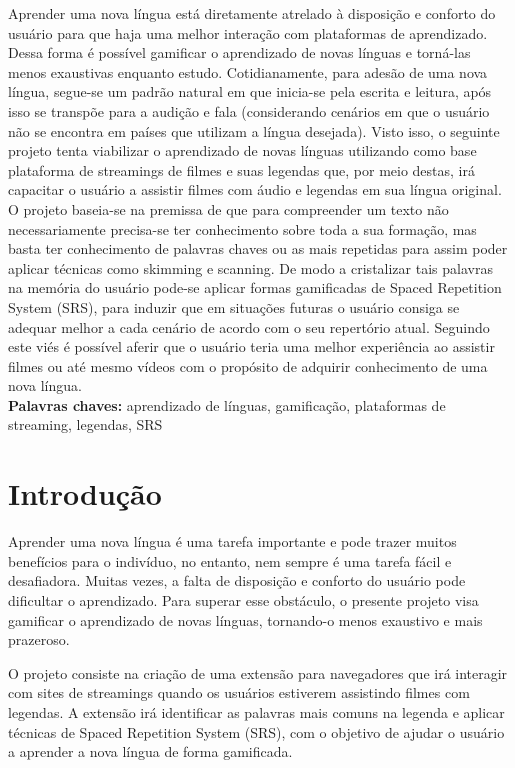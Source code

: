 \documentclass[12pt]{article}
\begin{document}
\begin{resumo} 
 Aprender uma nova língua está diretamente atrelado à disposição e conforto do usuário para que haja uma melhor interação com plataformas de aprendizado. Dessa forma é possível gamificar o aprendizado de novas línguas e torná-las menos exaustivas enquanto estudo. Cotidianamente, para adesão de uma nova língua, segue-se um padrão natural em que inicia-se pela escrita e leitura, após isso se transpõe para a audição e fala (considerando cenários em que o usuário não se encontra em países que utilizam a língua desejada). Visto isso, o seguinte projeto tenta viabilizar o aprendizado de novas línguas utilizando como base plataforma de streamings de filmes e suas legendas que, por meio destas, irá capacitar o usuário a assistir filmes com áudio e legendas em sua língua original.
O projeto baseia-se na premissa de que para compreender um texto não necessariamente precisa-se ter conhecimento sobre toda a sua formação, mas basta ter conhecimento de palavras chaves ou as mais repetidas para assim poder aplicar técnicas como skimming e scanning. De modo a cristalizar tais palavras na memória do usuário pode-se aplicar formas gamificadas de
Spaced Repetition System (SRS), para induzir que em situações futuras o usuário
consiga se adequar melhor a cada cenário de acordo com o seu repertório atual. Seguindo este viés é possível aferir que o usuário teria uma melhor experiência ao assistir filmes ou até
mesmo vídeos com o propósito de adquirir conhecimento de uma nova língua.
\\

\textbf{Palavras chaves:} aprendizado de línguas, gamificação, plataformas de streaming, legendas, SRS
\end{resumo}


\section{Introdução}

Aprender uma nova língua é uma tarefa importante e pode trazer muitos benefícios para o indivíduo, no entanto, nem sempre é uma tarefa fácil e desafiadora. Muitas vezes, a falta de disposição e conforto do usuário pode dificultar o aprendizado. Para superar esse obstáculo, o presente projeto visa gamificar o aprendizado de novas línguas, tornando-o menos exaustivo e mais prazeroso.

O projeto consiste na criação de uma extensão para navegadores que irá interagir com sites de streamings quando os usuários estiverem assistindo filmes com legendas. A extensão irá identificar as palavras mais comuns na legenda e aplicar técnicas de Spaced Repetition System (SRS), com o objetivo de ajudar o usuário a aprender a nova língua de forma gamificada.
\end{document}
